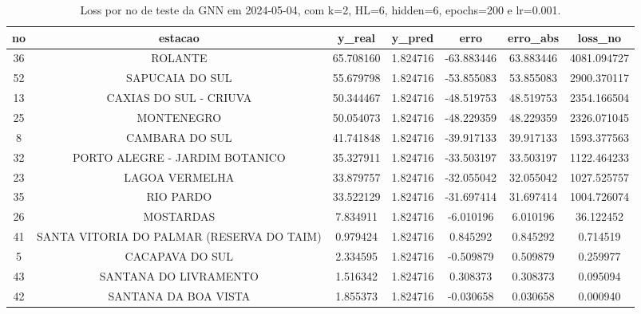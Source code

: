 \begin{table}[h]
\centering
\caption{Loss por no de teste da GNN em 2024-05-04, com k=2, HL=6, hidden=6, epochs=200 e lr=0.001.}
\label{tab:gnn_loss_k2_hl6_h6_e200_d20240504}
\begin{tabular}{ccccccc}
\toprule
no & estacao & y\_real & y\_pred & erro & erro\_abs & loss\_no \\
\midrule
36 & ROLANTE & 65.708160 & 1.824716 & -63.883446 & 63.883446 & 4081.094727 \\
52 & SAPUCAIA DO SUL & 55.679798 & 1.824716 & -53.855083 & 53.855083 & 2900.370117 \\
13 & CAXIAS DO SUL - CRIUVA & 50.344467 & 1.824716 & -48.519753 & 48.519753 & 2354.166504 \\
25 & MONTENEGRO & 50.054073 & 1.824716 & -48.229359 & 48.229359 & 2326.071045 \\
8 & CAMBARA DO SUL & 41.741848 & 1.824716 & -39.917133 & 39.917133 & 1593.377563 \\
32 & PORTO ALEGRE - JARDIM BOTANICO & 35.327911 & 1.824716 & -33.503197 & 33.503197 & 1122.464233 \\
23 & LAGOA VERMELHA & 33.879757 & 1.824716 & -32.055042 & 32.055042 & 1027.525757 \\
35 & RIO PARDO & 33.522129 & 1.824716 & -31.697414 & 31.697414 & 1004.726074 \\
26 & MOSTARDAS & 7.834911 & 1.824716 & -6.010196 & 6.010196 & 36.122452 \\
41 & SANTA VITORIA DO PALMAR (RESERVA DO TAIM) & 0.979424 & 1.824716 & 0.845292 & 0.845292 & 0.714519 \\
5 & CACAPAVA DO SUL & 2.334595 & 1.824716 & -0.509879 & 0.509879 & 0.259977 \\
43 & SANTANA DO LIVRAMENTO & 1.516342 & 1.824716 & 0.308373 & 0.308373 & 0.095094 \\
42 & SANTANA DA BOA VISTA & 1.855373 & 1.824716 & -0.030658 & 0.030658 & 0.000940 \\
\bottomrule
\end{tabular}
\end{table}
